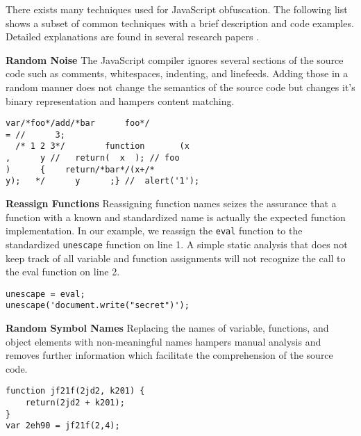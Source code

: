 			There exists many techniques used for JavaScript obfuscation. The following list shows a subset of common techniques with a brief description and code examples. Detailed explanations are found in several research papers \cite{caffinemonkey, Xu:2013:JMS:2435349.2435364, kim2011suspicious}.
			
			\def\leftside{0.475\textwidth}
			\def\rightside{0.475\textwidth}
			\begin{itemize}
					\begin{minipage}{\leftside}
						\item \textbf{Random Noise} The JavaScript compiler ignores several sections of the source code such as comments, whitespaces, indenting, and linefeeds. Adding those in a random manner does not change the semantics of the source code but changes it's binary representation and hampers content matching.
					\end{minipage} \hspace{1em}
					\begin{minipage}{\rightside}	
							\begin{lstlisting}
var/*foo*/add/*bar      foo*/
= //      3;
  /* 1 2 3*/        function       (x
,      y //   return(  x  ); // foo
)      {    return/*bar*/(x+/*
y);   */      y      ;} //  alert('1');\end{lstlisting}
					\end{minipage} 
			
					\begin{minipage}{\leftside}
						\item \textbf{Reassign Functions} Reassigning function names seizes the assurance that a function with a known and standardized name is actually the expected function implementation. In our example, we reassign the \texttt{eval} function to the standardized \texttt{unescape} function on line 1. A simple static analysis that does not keep track of all variable and function assignments will not recognize the call to the eval function on line 2.
					\end{minipage} \hspace{1em}
					\begin{minipage}{\rightside}	
						\begin{lstlisting}
unescape = eval;
unescape('document.write("secret")');\end{lstlisting}
					\end{minipage} 
					
					\begin{minipage}{\leftside}
						\item \textbf{Random Symbol Names} Replacing the names of variable, functions, and object elements with non-meaningful names hampers manual analysis and removes further information which facilitate the comprehension of the source code.
					\end{minipage} \hspace{1em}
					\begin{minipage}{\rightside}	
						\begin{lstlisting}
function jf21f(2jd2, k201) {
	return(2jd2 + k201);
}
var 2eh90 = jf21f(2,4);\end{lstlisting}
					\end{minipage} 	
					

\end{itemize}
